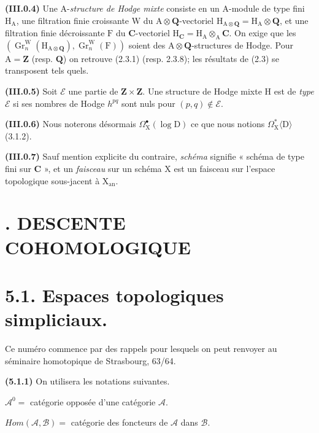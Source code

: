 \documentclass[11pt,leqno]{article}
\begin{document}
\textbf{(III.0.4)} Une \(\mathrm{A}\)-\textit{structure de Hodge mixte} consiste en un \(\mathrm{A}\)-module de type fini \(\mathrm{H}_{\mathrm{A}}\), une filtration finie croissante \(\mathrm{W}\) du \(\mathrm{A}\otimes\mathbf{Q}\)-vectoriel \(\mathrm{H}_{\mathrm{A}\otimes\mathbf{Q}}=\mathrm{H}_{\mathrm{A}}\otimes\mathbf{Q}\), et une filtration finie décroissante \(\mathrm{F}\) du \(\mathbf{C}\)-vectoriel \(\mathrm{H}_{\mathbf{C}}=\mathrm{H}_{\mathrm{A}}\otimes_{\mathrm{A}}\mathbf{C}\). On exige que les \((\operatorname{Gr}^{\mathrm{W}}_n(\mathrm{H}_{\mathrm{A}\otimes\mathbf{Q}}),\operatorname{Gr}^{\mathrm{W}}_n(\mathrm{F}))\) soient des \(\mathrm{A}\otimes\mathbf{Q}\)-structures de Hodge. Pour \(\mathrm{A}=\mathbf{Z}\) (resp. \(\mathbf{Q}\)) on retrouve (2.3.1) (resp. 2.3.8); les résultats de (2.3) se transposent tels quels.

\textbf{(III.0.5)} Soit \(\mathscr{E}\) une partie de \(\mathbf{Z}\times\mathbf{Z}\). Une structure de Hodge mixte \(\mathrm{H}\) est de \textit{type} \(\mathscr{E}\) si ses nombres de Hodge \(h^{pq}\) sont nuls pour \((p,q)\notin\mathscr{E}\).

\textbf{(III.0.6)} Nous noterons désormais \(\Omega_{\mathrm{X}}^{\bullet}(\log\mathrm{D})\) ce que nous notions \(\Omega_{\mathrm{X}}^*\langle\mathrm{D}\rangle\) (3.1.2).

\textbf{(III.0.7)} Sauf mention explicite du contraire, \textit{schéma} signifie « schéma de type fini sur \(\mathbf{C}\) », et un \textit{faisceau} sur un schéma \(\mathrm{X}\) est un faisceau sur l’espace topologique sous-jacent à \(\mathrm{X}_{\mathrm{an}}\).

\section*{. DESCENTE COHOMOLOGIQUE}

\section*{5.1. Espaces topologiques simpliciaux.}

Ce numéro commence par des rappels pour lesquels on peut renvoyer au séminaire homotopique de Strasbourg, 63/64.

\textbf{(5.1.1)} On utilisera les notations suivantes.

\noindent \(\mathscr{A}^{0}=\) catégorie opposée d’une catégorie \(\mathscr{A}\).\par
\noindent \(\mathit{Hom}(\mathscr{A},\mathscr{B})=\) catégorie des foncteurs de \(\mathscr{A}\) dans \(\mathscr{B}\).\par
\end{document}
